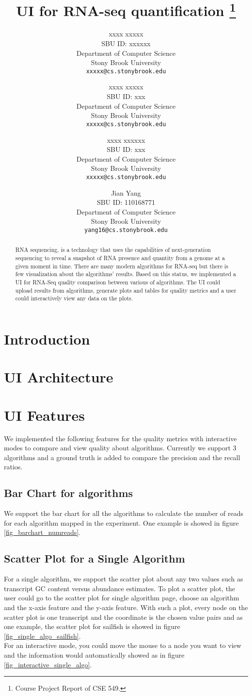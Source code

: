 \documentclass[11pt,letter]{article}
\title{UI for RNA-seq quantification \footnote{Course Project Report of CSE 549.}}
\author{
xxxx xxxxx\\
       {\small SBU ID: xxxxxx}\\
       {\small Department of Computer Science}\\
       {\small Stony Brook University} \\
       {\small \texttt{xxxxx@cs.stonybrook.edu}}
\and
xxxx xxxxx \\
       {\small SBU ID: xxx}\\
       {\small Department of Computer Science}\\
       {\small Stony Brook University} \\
       {\small \texttt{xxxxx@cs.stonybrook.edu}}
\and
xxxx xxxxxx \\
       {\small SBU ID: xxx}\\
       {\small Department of Computer Science}\\
       {\small Stony Brook University} \\
       {\small \texttt{xxxxx@cs.stonybrook.edu}}
\and
Jian Yang \\
       {\small SBU ID: 110168771}\\
       {\small Department of Computer Science}\\
       {\small Stony Brook University}\\
       {\small \texttt{yang16@cs.stonybrook.edu}}
}
\date{}
\begin{document}
\maketitle

\begin{abstract}
RNA sequencing, is a technology that uses the capabilities of next-generation sequencing to reveal a snapshot of RNA presence and quantity from a genome at a given moment in time. There are many modern algorithms for RNA-seq but there is few visualization about the algorithms' results. Based on this status, we implemented a UI for RNA-Seq quality comparison between various of algorithms. The UI could upload results from algorithms, generate plots and tables for quality metrics and a user could interactively view any data on the plots.
\end{abstract}

\thispagestyle{empty}
\addtocounter{page}{0}

\section {Introduction}

\section {UI Architecture}

\section {UI Features}
We implemented the following features for the quality metrics with interactive modes to compare and view quality about algorithms. Currently we support 3 algorithms and a ground truth is added to compare the precision and the recall ratios.
\subsection {Bar Chart for algorithms}
We support the bar chart for all the algorithms to calculate the number of reads for each algorithm mapped in the experiment. One example is showed in figure \ref{fig_barchart_numreads}.

\subsection {Scatter Plot for a Single Algorithm}
For a single algorithm, we support the scatter plot about any two values such as transcript GC content versus abundance estimates. To plot a scatter plot, the user could go to the scatter plot for single algorithm page, choose an algorithm and the x-axis feature and the y-axis feature. With such a plot, every node on the scatter plot is one transcript and the coordinate is the chosen value pairs and as one example, the scatter plot for sailfish is showed in figure \ref{fig_single_algo_sailfish}. \\
For an interactive mode, you could move the mouse to a node you want to view and the information would automatically showed as in figure \ref{fig_interactive_single_algo}.
\end{document}
